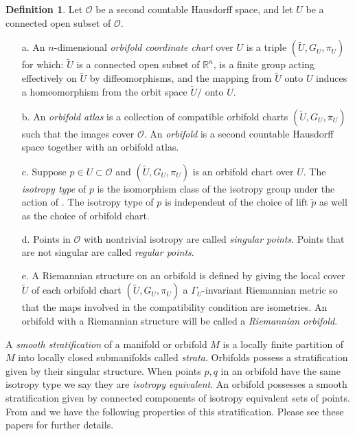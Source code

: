 \documentclass{amsart}
\theoremstyle{plain}
\theoremstyle{definition}
\newtheorem{definition}[thm]{Definition}
\theoremstyle{remark}
\newcommand{\R}{\mathbb{R}}
\newcommand{\wtu}{\widetilde{U}}
\newcommand{\orb}{\mathcal O}
\newcommand{\cc}{(\widetilde{U}, G_U, \pi_U)}
\begin{document}
\begin{definition} \label{defn:ofld}
Let $\orb$ be a second countable Hausdorff space, and let $U$ be a connected open subset of $\orb$.   
 \begin{enumerate}
\item[a.] An $n$-dimensional \emph{orbifold coordinate chart} over $U$ is a
    triple $\cc$ for which: $\wtu$ is a connected open subset of $\R^n$,
     is a finite group acting effectively on
    $\wtu$ by diffeomorphisms, and the mapping 
    from $\wtu$ onto $U$\add{$\in \orb$} induces a homeomorphism from the orbit space
    $\wtu/$ onto $U$.
\item [b.] An \emph{orbifold atlas} is a collection of compatible orbifold
    charts $\cc$ such that the images \rep{$\varphi_U({\wtu})$}{$\pi_U$} cover $\orb$.  An \emph{orbifold} is a second countable Hausdorff space together with an orbifold atlas.  
\item[c.] Suppose $p\in U\subset \orb$ and $\cc$ is an orbifold chart over
    $U$.  The \emph{isotropy type} of $p$ is the isomorphism class of the
isotropy group \rep{a lift of $p$ of a lift $\tilde p$ of $p$ in $\wtu$}{of
    $\tilde{p} \in \widetilde{U}$, a lift of $p$} under the action of
    .  The isotropy type of $p$ is independent of the choice of lift $\tilde p$ as well as the choice of orbifold chart.  
\item[d.] Points in $\orb$ with nontrivial isotropy are called \emph{singular points}.  Points that are not singular are called \emph{regular points}. 
\item[e.] A Riemannian structure on an orbifold is defined by giving the local cover $\wtu$ of each orbifold chart $\cc$ a $\Gamma_U$-invariant Riemannian metric so that the maps involved in the compatibility condition are isometries.  An orbifold with a Riemannian structure will be called a \emph{Riemannian orbifold}.  
\end{enumerate}
\end{definition}


 A \emph{smooth stratification} of a manifold or orbifold $M$ is a locally finite partition of $M$ into locally closed submanifolds called \emph{strata}.  Orbifolds possess a stratification given by their singular structure.  When points $p,q$ in an orbifold have the same isotropy type we say they are \emph{isotropy equivalent}.  An orbifold possesses a smooth stratification given by connected components of isotropy equivalent sets of points.  From \cite[Theorem 1.24]{gordon12} and \cite[Proposition 2.13]{dggw} we have the following properties of this stratification.  Please see these papers for further details.
\end{document}
